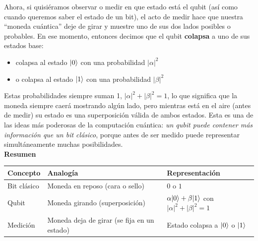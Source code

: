 Ahora, si quisiéramos observar o medir en que estado está el qubit (así como cuando queremos saber el estado de un bit), el acto de medir hace que nuestra ``moneda cuántica'' deje de girar y muestre uno de sus dos lados posibles o probables. En ese momento, entonces decimos que el qubit \textbf{colapsa} a uno de sus estados base:

\begin{itemize}
	\item colapsa al estado $|0\rangle$ con una probabilidad $|\alpha|^2$  
	\item o colapsa al estado $|1\rangle$ con una probabilidad $|\beta|^2$
\end{itemize}

Estas probabilidades siempre suman 1, $|\alpha|^2 + |\beta|^2 = 1$, lo que significa que la moneda siempre caerá mostrando algún lado, pero mientras está en el aire (antes de medir) su estado es una superposición válida de ambos estados. Esta es una de las ideas más poderosas de la computación cuántica:  \textit{un qubit puede contener más información que un bit clásico},  porque antes de ser medido puede representar simultáneamente muchas posibilidades. \\


\noindent \textbf{Resumen}

\begin{center}
	\begin{tabular}{|l|l|l|}
		\hline
		\textbf{Concepto} & \textbf{Analogía} & \textbf{Representación} \\
		\hline
		Bit clásico & Moneda en reposo (cara o sello) & $0$ o $1$ \\
		\hline
		Qubit & Moneda girando (superposición) & $\alpha|0\rangle + \beta|1\rangle$ con $|\alpha|^2 + |\beta|^2 = 1$ \\
		\hline
		Medición & Moneda deja de girar (se fija en un estado) & Estado colapsa a $|0\rangle$ o $|1\rangle$ \\
		\hline
	\end{tabular}
\end{center}

